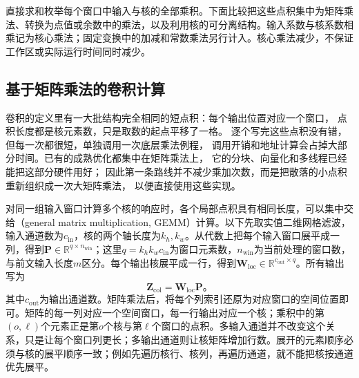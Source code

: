 直接求和枚举每个窗口中输入与核的全部乘积。下面比较把这些点积集中为矩阵乘法、转换为点值或余数中的乘法，以及利用核的可分离结构。输入系数与核系数相乘记为核心乘法；固定变换中的加减和常数乘法另行计入。核心乘法减少，不保证工作区或实际运行时间同时减少。

\subsection{基于矩阵乘法的卷积计算}\label{sec:signal-analysis-fast-matrix}
\label{sec:cnn-matrix-algorithm}

卷积的定义里有一大批结构完全相同的短点积：每个输出位置对应一个窗口，
点积长度都是核元素数，只是取数的起点平移了一格。
逐个写完这些点积没有错，但每一次都很短，单独调用一次底层乘法例程，
调用开销和地址计算会占掉大部分时间。已有的成熟优化都集中在矩阵乘法上，
它的分块、向量化和多线程已经能把这部分硬件用好；
因此第一条路线并不减少乘加次数，而是把散落的小点积重新组织成一次大矩阵乘法，
以便直接使用这些实现。

对同一组输入窗口计算多个核的响应时，各个局部点积具有相同长度，可以集中交给（general matrix multiplication, GEMM）计算。以下先取实值二维网格滤波，输入通道数为$c_{\mathrm{in}}$，核的两个轴长度为$k_h,k_w$。从代数上把每个输入窗口展平成一列，得到$\bm P\in\mathbb R^{q\times n_{\mathrm{win}}}$；这里$q=k_hk_wc_{\mathrm{in}}$为窗口元素数，$n_{\mathrm{win}}$为当前处理的窗口数，与前文输入长度$m$区分。每个输出核展平成一行，得到$\bm W_{\mathrm{loc}}\in\mathbb R^{c_{\mathrm{out}}\times q}$。所有输出写为
\begin{equation}
  \bm Z_{\mathrm{col}}=\bm W_{\mathrm{loc}}\bm P\text{。}
  \label{eq:signal-analysis-window-matrix-product}
\end{equation}
其中$c_{\mathrm{out}}$为输出通道数。矩阵乘法后，将每个列索引还原为对应窗口的空间位置即可。矩阵的每一列对应一个空间窗口，每一行输出对应一个核；乘积中的第$(o,\ell)$个元素正是第$o$个核与第$\ell$个窗口的点积。多输入通道并不改变这个关系，只是让每个窗口列更长；多输出通道则让核矩阵增加行数。展开的元素顺序必须与核的展平顺序一致；例如先遍历核行、核列，再遍历通道，就不能把核按通道优先展平。

